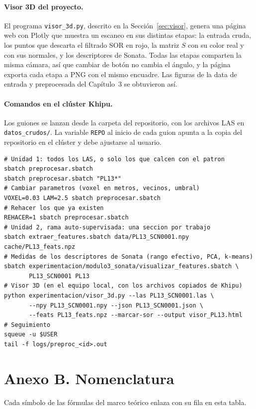 \paragraph*{Visor 3D del proyecto.}
El programa \texttt{visor\_3d.py}, descrito en la Sección~\ref{sec:visor}, genera
una página web con Plotly que muestra un escaneo en sus distintas etapas: la
entrada cruda, los puntos que descarta el filtrado SOR en rojo, la matriz $S$
con su color real y con sus normales, y los descriptores de Sonata. Todas las
etapas comparten la misma cámara, así que cambiar de botón no cambia el ángulo,
y la página exporta cada etapa a PNG con el mismo encuadre. Las figuras de la
data de entrada y preprocesada del Capítulo~3 se obtuvieron así.

\paragraph*{Comandos en el clúster Khipu.}
Los guiones se lanzan desde la carpeta del repositorio, con los archivos LAS en
\texttt{datos\_crudos/}. La variable \texttt{REPO} al inicio de cada guion
apunta a la copia del repositorio en el clúster y debe ajustarse al usuario.
\begin{lstlisting}[style=comando]
# Unidad 1: todos los LAS, o solo los que calcen con el patron
sbatch preprocesar.sbatch
sbatch preprocesar.sbatch "PL13*"
# Cambiar parametros (voxel en metros, vecinos, umbral)
VOXEL=0.03 LAM=2.5 sbatch preprocesar.sbatch
# Rehacer los que ya existen
REHACER=1 sbatch preprocesar.sbatch
# Unidad 2, rama auto-supervisada: una seccion por trabajo
sbatch extraer_features.sbatch data/PL13_SCN0001.npy cache/PL13_feats.npz
# Medidas de los descriptores de Sonata (rango efectivo, PCA, k-means)
sbatch experimentacion/modulo3_sonata/visualizar_features.sbatch \
       PL13_SCN0001 PL13
# Visor 3D (en el equipo local, con los archivos copiados de Khipu)
python experimentacion/visor_3d.py --las PL13_SCN0001.las \
       --npy PL13_SCN0001.npy --json PL13_SCN0001.json \
       --feats PL13_feats.npz --marcar-sor --output visor_PL13.html
# Seguimiento
squeue -u $USER
tail -f logs/preproc_<id>.out
\end{lstlisting}


\section*{Anexo B. Nomenclatura}

\phantomsection\label{sec:anexo-nomenclatura}
Cada símbolo de las fórmulas del marco teórico enlaza con su fila en esta tabla.

